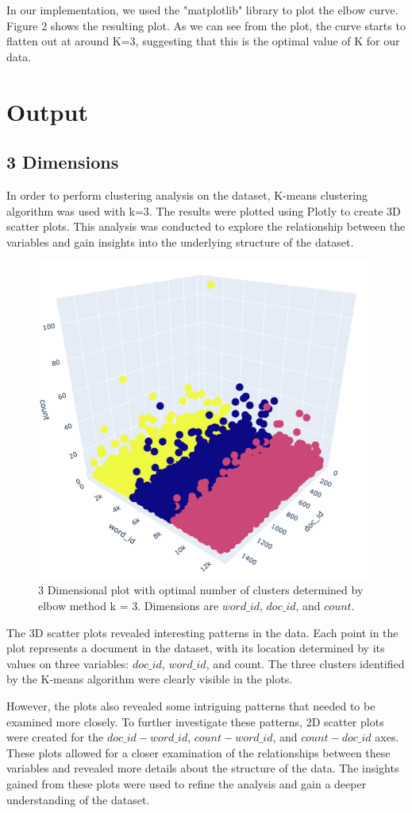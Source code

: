 \documentclass{article}
\begin{document}
In our implementation, we used the "matplotlib" library to plot the elbow curve. Figure 2 shows the resulting plot. As we can see from the plot, the curve starts to flatten out at around K=3, suggesting that this is the optimal value of K for our data.


\section{Output}


\subsection{3 Dimensions}

In order to perform clustering analysis on the dataset, K-means clustering algorithm was used with k=3. The results were plotted using Plotly to create 3D scatter plots. This analysis was conducted to explore the relationship between the variables and gain insights into the underlying structure of the dataset.
\begin{figure}[h]
    \centering
    \includegraphics[width=.4\textwidth]{figs/3d.png}
    \caption{3 Dimensional plot with optimal number of clusters determined by elbow method k = 3. Dimensions are $word\_id$, $doc\_id$, and $count$.}
\end{figure}

The 3D scatter plots revealed interesting patterns in the data. Each point in the plot represents a document in the dataset, with its location determined by its values on three variables: $doc\_id$, $word\_id$, and count. The three clusters identified by the K-means algorithm were clearly visible in the plots.

However, the plots also revealed some intriguing patterns that needed to be examined more closely. To further investigate these patterns, 2D scatter plots were created for the $doc\_id-word\_id$, $count-word\_id$, and $count-doc\_id$ axes. These plots allowed for a closer examination of the relationships between these variables and revealed more details about the structure of the data. The insights gained from these plots were used to refine the analysis and gain a deeper understanding of the dataset.
\end{document}
